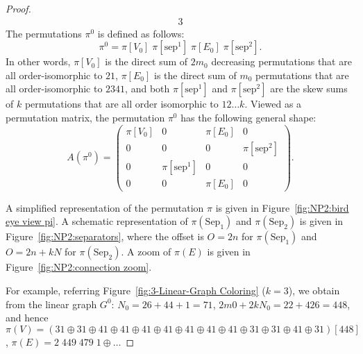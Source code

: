 \begin{proof}
\begin{alignat*}{3}
  \end{alignat*}
  The permutations $\pi^0$ is defined as follows:
  $$
  \pi^0 = \pi[V_0] \; \pi[\text{sep}^{1}] \; \pi[E_0] \; \pi[\text{sep}^{2}]\text{.}
  $$
  In other words,
  $\pi[V_0]$ is the direct sum of $2m_0$ decreasing permutations
  that are all order-isomorphic to $21$,
  $\pi[E_0]$ is the direct sum of $m_0$ permutations that are all
  order-isomorphic to $2341$, and
  both $\pi[\text{sep}^{1}]$ and $\pi[\text{sep}^{2}]$ are the skew sums
  of $k$ permutations that are all order isomorphic to $12 \dots k$.
  Viewed as a permutation matrix, the permutation $\pi^0$ has the following general shape:
  $$
    A(\pi^0) = 
    \begin{pmatrix}
      \pi[V_0] & 0                    & \pi[E_0] & 0 \\
      0        & 0                    & 0        & \pi[\text{sep}^{2}] \\
      0        & \pi[\text{sep}^{1}]  & 0        & 0  \\
      0        & 0                    & \pi[E_0] & 0 
    \end{pmatrix}\text{.}
  $$

  

  A simplified representation of the permutation $\pi$ is given in
  Figure~\ref{fig:NP2:bird eye view pi}.
  A schematic representation of $\pi(\text{Sep}_1)$ and $\pi(\text{Sep}_2)$
  is given in Figure~\ref{fig:NP2:separators}, where the offset is $O=2n$ for
  $\pi(\text{Sep}_1)$ and $O=2n+kN$ for $\pi(\text{Sep}_2)$.
  A zoom of $\pi(E)$ is given in Figure~\ref{fig:NP2:connection zoom}.

  For example, referring Figure~\ref{fig:3-Linear-Graph Coloring} ($k=3$), we
  obtain from the linear graph $G^0$:
  $N_0 = 26 + 44 + 1 = 71$, $2m0+2kN_0= 22 + 426 = 448$, and hence
  $\pi(V) = \left(3 1 \oplus 3 1 \oplus 4 1 \oplus 4 1 \oplus 4 1 \oplus
  4 1 \oplus 4 1 \oplus 4 1 \oplus 4 1 \oplus 3 1 \oplus 3 1 \oplus 4 1 \oplus 3 1\right) [448]$,
  $\pi(E) = 2\;449\;479\;1 \oplus \dots$


\end{proof}
